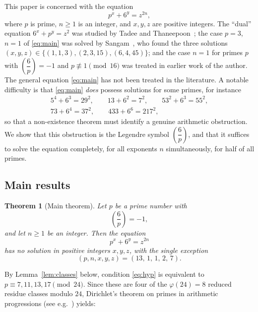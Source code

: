 \documentclass[preprint,12pt]{elsarticle}
\newtheorem{theorem}{Theorem}[section]
\theoremstyle{definition}
\newcommand{\leg}[2]{\left(\dfrac{#1}{#2}\right)}
\begin{document}
This paper is concerned with the equation
\begin{equation}\label{eq:main}
p^{x}+6^{y}=z^{2n},
\end{equation}
where $p$ is prime, $n\geq 1$ is an integer, and $x,y,z$ are positive
integers. The ``dual'' equation $6^{x}+p^{y}=z^{2}$ was studied by Tadee and
Thaneepoon~\cite{TadeeThaneepoon2023}; the case $p=3$, $n=1$ of
\eqref{eq:main} was solved by Sangam~\cite{Sangam2020}, who found the three
solutions $(x,y,z)\in\{(1,1,3),(2,3,15),(6,4,45)\}$; and the case $n=1$ for
primes $p$ with $\leg{6}{p}=-1$ and $p\not\equiv 1\pmod{16}$ was treated in
earlier work of the author. The general equation \eqref{eq:main} has not been
treated in the literature. A notable difficulty is that \eqref{eq:main}
\emph{does} possess solutions for some primes, for instance
\begin{equation}\label{eq:identities}
\begin{gathered}
5^{4}+6^{3}=29^{2},\qquad 13+6^{2}=7^{2},\qquad 53^{2}+6^{3}=55^{2},\\
73+6^{4}=37^{2},\qquad 433+6^{6}=217^{2},
\end{gathered}
\end{equation}
so that a non-existence theorem must identify a genuine arithmetic
obstruction. We show that this obstruction is the Legendre symbol
$\leg{6}{p}$, and that it suffices to solve the equation completely, for all
exponents $n$ simultaneously, for half of all primes.

\subsection{Main results}

\begin{theorem}[Main theorem]\label{thm:main}
Let $p$ be a prime number with
\begin{equation}\label{eq:hyp}
\leg{6}{p}=-1,
\end{equation}
and let $n\geq 1$ be an integer. Then the equation
\[
p^{x}+6^{y}=z^{2n}
\]
has no solution in positive integers $x,y,z$, with the single exception
\[
(p,n,x,y,z)=(13,\,1,\,1,\,2,\,7).
\]
\end{theorem}

By Lemma~\ref{lem:classes} below, condition \eqref{eq:hyp} is equivalent to
$p\equiv 7,11,13,17\pmod{24}$. Since these are four of the $\varphi(24)=8$
reduced residue classes modulo $24$, Dirichlet's theorem on primes in
arithmetic progressions (see e.g.\ \cite{Apostol1976}) yields:
\end{document}
